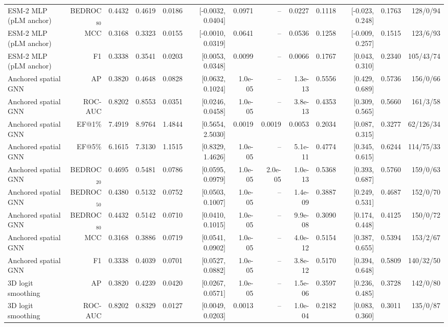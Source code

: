 \begin{table}[t]
\begin{tabular}{lrrrrrrrrrrrr}
ESM-2 MLP (pLM anchor) & BEDROC$_{80}$ & 0.4432 & 0.4619 & 0.0186 & [-0.0032, 0.0404] & 0.0971 & -- & 0.0227 & 0.1118 & [-0.023, 0.248] & 0.1763 & 128/0/94 \\
ESM-2 MLP (pLM anchor) & MCC & 0.3168 & 0.3323 & 0.0155 & [-0.0010, 0.0319] & 0.0641 & -- & 0.0536 & 0.1258 & [-0.009, 0.257] & 0.1515 & 123/6/93 \\
ESM-2 MLP (pLM anchor) & F1 & 0.3338 & 0.3541 & 0.0203 & [0.0053, 0.0348] & 0.0099 & -- & 0.0066 & 0.1767 & [0.043, 0.310] & 0.2340 & 105/43/74 \\
Anchored spatial GNN & AP & 0.3820 & 0.4648 & 0.0828 & [0.0632, 0.1024] & 1.0e-05 & -- & 1.3e-13 & 0.5556 & [0.429, 0.689] & 0.5736 & 156/0/66 \\
Anchored spatial GNN & ROC-AUC & 0.8202 & 0.8553 & 0.0351 & [0.0246, 0.0458] & 1.0e-05 & -- & 3.8e-13 & 0.4353 & [0.309, 0.565] & 0.5660 & 161/3/58 \\
Anchored spatial GNN & EF@1\% & 7.4919 & 8.9764 & 1.4844 & [0.5654, 2.5030] & 0.0019 & 0.0019 & 0.0053 & 0.2034 & [0.087, 0.315] & 0.3277 & 62/126/34 \\
Anchored spatial GNN & EF@5\% & 6.1615 & 7.3130 & 1.1515 & [0.8329, 1.4626] & 1.0e-05 & -- & 5.1e-11 & 0.4774 & [0.345, 0.615] & 0.6244 & 114/75/33 \\
Anchored spatial GNN & BEDROC$_{20}$ & 0.4695 & 0.5481 & 0.0786 & [0.0595, 0.0979] & 1.0e-05 & 2.0e-05 & 1.0e-13 & 0.5368 & [0.393, 0.687] & 0.5760 & 159/0/63 \\
Anchored spatial GNN & BEDROC$_{50}$ & 0.4380 & 0.5132 & 0.0752 & [0.0503, 0.1007] & 1.0e-05 & -- & 1.4e-09 & 0.3887 & [0.249, 0.531] & 0.4687 & 152/0/70 \\
Anchored spatial GNN & BEDROC$_{80}$ & 0.4432 & 0.5142 & 0.0710 & [0.0410, 0.1015] & 1.0e-05 & -- & 9.9e-08 & 0.3090 & [0.174, 0.448] & 0.4125 & 150/0/72 \\
Anchored spatial GNN & MCC & 0.3168 & 0.3886 & 0.0719 & [0.0541, 0.0902] & 1.0e-05 & -- & 4.0e-12 & 0.5154 & [0.387, 0.655] & 0.5394 & 153/2/67 \\
Anchored spatial GNN & F1 & 0.3338 & 0.4039 & 0.0701 & [0.0527, 0.0882] & 1.0e-05 & -- & 3.8e-12 & 0.5170 & [0.394, 0.648] & 0.5809 & 140/32/50 \\
3D logit smoothing & AP & 0.3820 & 0.4239 & 0.0420 & [0.0267, 0.0571] & 1.0e-05 & -- & 1.5e-06 & 0.3597 & [0.236, 0.485] & 0.3728 & 142/0/80 \\
3D logit smoothing & ROC-AUC & 0.8202 & 0.8329 & 0.0127 & [0.0049, 0.0203] & 0.0013 & -- & 1.0e-04 & 0.2182 & [0.083, 0.360] & 0.3011 & 135/0/87 \\

\end{tabular}
\end{table}
